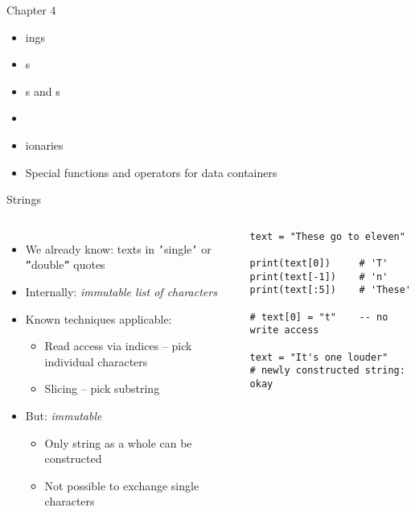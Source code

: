 
\begin{frame}[t,plain]
\titlepage
\end{frame}


\begin{frame}[fragile]{Chapter 4}
%
\begin{itemize}
\item {}ings
\item {}s
\item {}s and s
\item {}
\item {}ionaries
\item Special functions and operators for data containers
\end{itemize}
%
\end{frame}


\begin{frame}[fragile]{Strings}
%
\begin{columns}[T]
\begin{itemize}
\item We already know: texts in \texttt{'}single\texttt{'} or \texttt{''}double\texttt{''} quotes
\item Internally: \emph{immutable list of characters}
\item Known techniques applicable:
	\begin{itemize}
	\item Read access via indices -- pick individual characters
	\item Slicing -- pick substring
	\end{itemize}
\item But: \emph{immutable}
	\begin{itemize}
	\item Only string as a whole can be constructed
	\item Not possible to exchange single characters
	\end{itemize}
\end{itemize}
%
\begin{codebox}
\begin{verbatim}
text = "These go to eleven"

print(text[0])     # 'T'
print(text[-1])    # 'n'
print(text[:5])    # 'These'

# text[0] = "t"    -- no write access

text = "It's one louder" 
# newly constructed string: okay
\end{verbatim}
\end{codebox}
\end{columns}
%
\end{frame}

